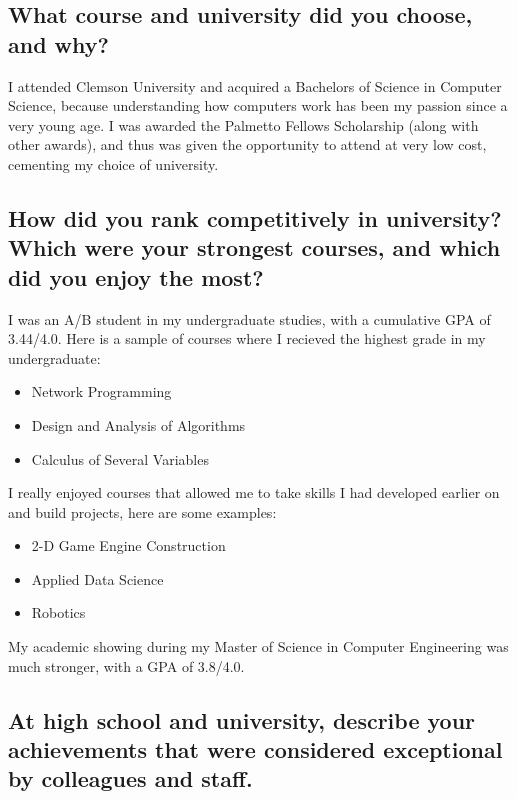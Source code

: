 \documentclass{article}
\begin{document}
\subsection{What course and university did you choose, and why?}

I attended Clemson University and acquired a Bachelors of Science in Computer
Science, because understanding how computers work has been my passion since a
very young age. I was awarded the Palmetto Fellows Scholarship (along with other
awards), and thus was given the opportunity to attend at very low cost, cementing
my choice of university.

\subsection{How did you rank competitively in university? Which were your
  strongest courses, and which did you enjoy the most?}

I was an A/B student in my undergraduate studies, with a cumulative GPA of
3.44/4.0. Here is a sample of courses where I recieved the highest grade in my
undergraduate:

\begin{itemize}
  \item Network Programming
  \item Design and Analysis of Algorithms
  \item Calculus of Several Variables
\end{itemize}

I really enjoyed courses that allowed me to take skills I had developed earlier
on and build projects, here are some examples:

\begin{itemize}
  \item 2-D Game Engine Construction
  \item Applied Data Science
  \item Robotics
\end{itemize}

My academic showing during my Master of Science in Computer Engineering was much stronger, with a GPA of 3.8/4.0.

\subsection{At high school and university, describe your achievements that were
  considered exceptional by colleagues and staff.}
\end{document}
